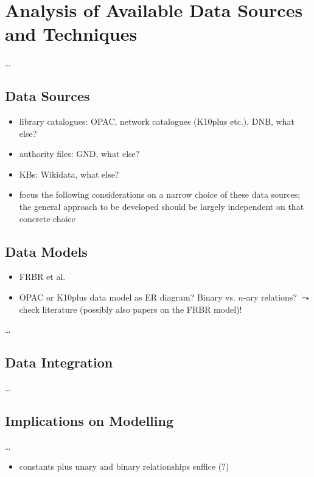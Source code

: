 \chapter{Analysis of Available Data Sources and Techniques}
\label{chap:analysis}

\dots

\section{Data Sources}
\label{sec:data_sources}

\begin{itemize}
  \item
    library catalogues: OPAC, network catalogues (K10plus etc.), DNB, what else?
  \item
    authority files: GND, what else?
  \item
    KBs: Wikidata, what else?
  \item
    focus the following considerations on a narrow choice of these data sources;
    the general approach to be developed should be largely independent on that concrete choice
\end{itemize}

\section{Data Models}
\label{sec:data_models}

\begin{itemize}
  \item
    FRBR et al.
  \item 
    OPAC or K10plus data model as ER diagram? Binary vs. $n$-ary relations?
    $\leadsto$ check literature (possibly also papers on the FRBR model)!
\end{itemize}

\dots

\section{Data Integration}
\label{sec:data_integration}

\dots

\section{Implications on Modelling}
\label{sec:implications_on_modelling}

\dots

\begin{itemize}
  \item
    constants plus unary and binary relationships suffice (?)
\end{itemize}


